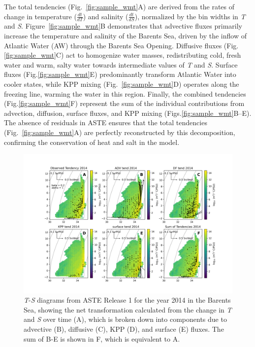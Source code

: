 \documentclass[draft]{agujournal2019}
\begin{document}
The total tendencies (Fig.~\ref{fig:sample_wmt}A) are derived from the rates of change in temperature ($\frac{dt}{dT}$) and salinity ($\frac{dt}{dS}$), normalized by the bin widths in \emph{T} and \emph{S}. Figure~\ref{fig:sample_wmt}B demonstrates that advective fluxes primarily increase the temperature and salinity of the Barents Sea, driven by the inflow of Atlantic Water (AW) through the Barents Sea Opening. Diffusive fluxes (Fig.\ref{fig:sample_wmt}C) act to homogenize water masses, redistributing cold, fresh water and warm, salty water towards intermediate values of \emph{T} and \emph{S}. Surface fluxes (Fig.\ref{fig:sample_wmt}E) predominantly transform Atlantic Water into cooler states, while KPP mixing (Fig.~\ref{fig:sample_wmt}D) operates along the freezing line, warming the water in this region. Finally, the combined tendencies (Fig.\ref{fig:sample_wmt}F) represent the sum of the individual contributions from advection, diffusion, surface fluxes, and KPP mixing (Figs.\ref{fig:sample_wmt}B--E). The absence of residuals in ASTE ensures that the total tendencies (Fig.~\ref{fig:sample_wmt}A) are perfectly reconstructed by this decomposition, confirming the conservation of heat and salt in the model.


    \begin{figure}
    \includegraphics[width=\linewidth]{figs/BarentsS_alltend_2014.png}
    \vspace{-5pt} %
    \caption{\emph{T}-\emph{S} diagrams from ASTE Release 1 for the year 2014 in the Barents Sea, showing the net transformation calculated from the change in \emph{T} and \emph{S} over time (A), which is broken down into components due to advective (B), diffusive (C), KPP (D), and surface (E) fluxes. The sum of B-E is shown in F, which is equivalent to A.}
    \label{fig:TS_example}
    \vspace{-20pt}
    \end{figure}
\end{document}
